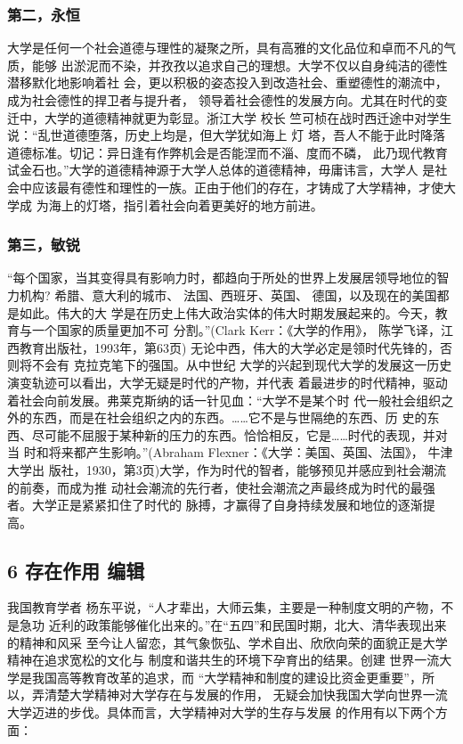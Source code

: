 \documentclass[11pt]{ctexart}
\begin{document}
{{{{\subsubsection{第二，永恒}
\label{sec:org0f63073}

大学是任何一个社会道德与理性的凝聚之所，具有高雅的文化品位和卓而不凡的气质，能够
出淤泥而不染，并孜孜以追求自己的理想。大学不仅以自身纯洁的德性潜移默化地影响着社
会，更以积极的姿态投入到改造社会、重塑德性的潮流中，成为社会德性的捍卫者与提升者，
领导着社会德性的发展方向。尤其在时代的变迁中，大学的道德精神就更为彰显。浙江大学
校长 竺可桢在战时西迁途中对学生说：“乱世道德堕落，历史上均是，但大学犹如海上 灯
塔，吾人不能于此时降落道德标准。切记：异日逢有作弊机会是否能涅而不淄、度而不磷，
此乃现代教育试金石也。”大学的道德精神源于大学人总体的道德精神，毋庸讳言，大学人
是社会中应该最有德性和理性的一族。正由于他们的存在，才铸成了大学精神，才使大学成
为海上的灯塔，指引着社会向着更美好的地方前进。


\subsubsection{第三，敏锐}
\label{sec:org48fbca5}

“每个国家，当其变得具有影响力时，都趋向于所处的世界上发展居领导地位的智力机构?
希腊、意大利的城市、 法国、西班牙、英国、 德国，以及现在的美国都是如此。伟大的大
学是在历史上伟大政治实体的伟大时期发展起来的。今天，教育与一个国家的质量更加不可
分割。”(Clark Kerr：《大学的作用》， 陈学飞译，江西教育出版社，1993年，第63页)
无论中西，伟大的大学必定是领时代先锋的，否则将不会有 克拉克笔下的强国。从中世纪
大学的兴起到现代大学的发展这一历史演变轨迹可以看出，大学无疑是时代的产物，并代表
着最进步的时代精神，驱动着社会向前发展。弗莱克斯纳的话一针见血：“大学不是某个时
代一般社会组织之外的东西，而是在社会组织之内的东西。……它不是与世隔绝的东西、历
史的东西、尽可能不屈服于某种新的压力的东西。恰恰相反，它是……时代的表现，并对当
时和将来都产生影响。”(Abraham Flexner：《大学：美国、英国、法国》， 牛津大学出
版社，1930，第3页)大学，作为时代的智者，能够预见并感应到社会潮流的前奏，而成为推
动社会潮流的先行者，使社会潮流之声最终成为时代的最强者。大学正是紧紧扣住了时代的
脉搏，才赢得了自身持续发展和地位的逐渐提高。


\subsection{6 存在作用 编辑}
\label{sec:org52dd38b}

我国教育学者 杨东平说，“人才辈出，大师云集，主要是一种制度文明的产物，不是急功
近利的政策能够催化出来的。”在“五四”和民国时期，北大、清华表现出来的精神和风采
至今让人留恋，其气象恢弘、学术自出、欣欣向荣的面貌正是大学精神在追求宽松的文化与
制度和谐共生的环境下孕育出的结果。创建 世界一流大学是我国高等教育改革的追求，而
“大学精神和制度的建设比资金更重要”，所以，弄清楚大学精神对大学存在与发展的作用，
无疑会加快我国大学向世界一流大学迈进的步伐。具体而言，大学精神对大学的生存与发展
的作用有以下两个方面：


}}}}
\end{document}
